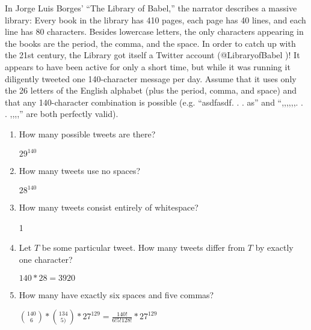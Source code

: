 \question In Jorge Luis Borges’ “The Library of Babel,” the narrator 
describes a massive library: Every book in the library has 410 pages, 
each page has 40 lines, and each line has 80 characters. Besides 
lowercase letters, the only characters appearing in the books are the 
period, the comma, and the space. In order to catch up with the 21st 
century, the Library got itself a Twitter account (@LibraryofBabel )! 
It appears to have been active for only a short time, but while it 
was running it diligently tweeted one 140-character message per day. 
Assume that it uses only the 26 letters of the English alphabet 
(plus the period, comma, and space) and that any 140-character 
combination is possible (e.g. “asdfasdf. . . as” and “,,,,,,. . . ,,,,” 
are both perfectly valid). 

\begin{enumerate}[label=(\alph*)]
\item How many possible tweets are there? 
\begin{solution}[1 cm]
$29^{140}$
\end{solution}

\item How many tweets use no spaces? 
\begin{solution}[1 cm]
$28^{140}$
\end{solution}

\item How many tweets consist entirely of whitespace? 
\begin{solution}[1 cm]
1
\end{solution}

\item Let $T$ be some particular tweet. How many tweets differ from $T$ by exactly one character? 
\begin{solution}[1 cm]
$140*28 = 3920$
\end{solution}

\item How many have exactly six spaces and five commas? 
\begin{solution}[1 cm]
${140 \choose 6} * {134 \choose 5)} * 27^{129} = 
\frac{140!}{6!5!128!} * 27^{129}$
\end{solution}
\end{enumerate}